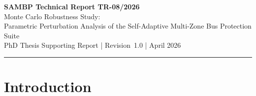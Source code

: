 \documentclass[12pt,a4paper]{article}
\newcommand{\SAMBP}{\textsc{sambp}}
\begin{document}
\begin{center}
  {\LARGE\bfseries\color{sambpblue}
    SAMBP Technical Report TR-08/2026}\\[6pt]
  {\large Monte Carlo Robustness Study:\\
    Parametric Perturbation Analysis of the
    Self-Adaptive Multi-Zone Bus Protection Suite}\\[10pt]
  {\normalsize PhD Thesis Supporting Report \quad|\quad
    Revision~1.0 \quad| April 2026}
\end{center}

\vspace{4pt}\hrule\vspace{8pt}

\begin{abstract}
\noindent
This report presents a Monte Carlo robustness study of the \SAMBP{}
protection suite.  Two hundred independent parametric perturbation
trials are applied to each of twenty fault scenarios (ten locations
$\times$ two fault types), yielding 4\,000 total simulation runs.
Perturbations target peak current magnitude ($\pm20\,\%$), DC offset
($\pm30\,\%$), decay time-constant ($\pm20\,\%$), and fault-inception
angle ($\pm45^\circ$).  Aggregate sensitivity and false positive rate
are reported for both the conventional threshold-based relay and the
\SAMBP{} Stage-2 confidence gate.  The study reveals that (i)~the
Stage-2 gate introduces a 9.9\,\% sensitivity reduction relative to the
conventional relay under extreme perturbation, with losses concentrated
in bus differential zones for high-current three-phase events; (ii)~a
6.25\,\% false positive rate is shared by both methods and is traced to
a perturbation-model artefact in transformer differential zones under
external faults; and (iii)~the veto gate correctly classifies
\SI{81.7}{\percent} of all Stage-2 interventions.  Recommendations for
gate-threshold recalibration and perturbation-model refinement are
given.
\end{abstract}

\tableofcontents
\listoffigures
\listoftables

\newpage

\section{Introduction}
\end{document}
